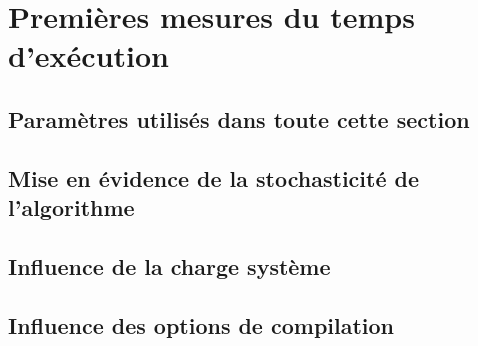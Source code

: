 
\section{Premières mesures du temps d'exécution}

\subsection{Paramètres utilisés dans toute cette section}


\subsection{Mise en évidence de la stochasticité de l'algorithme}





\subsection{Influence de la charge système}

\subsection{Influence des options de compilation}
